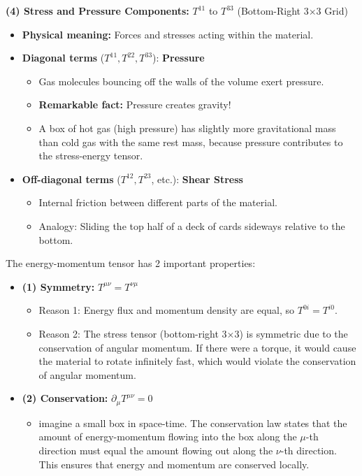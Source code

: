 \begin{foundation}
  \bigskip\noindent
  \textbf{(4) Stress and Pressure Components: } $T^{11}$ to $T^{33}$ (Bottom-Right 3×3 Grid)
  \begin{itemize}
    \item \textbf{Physical meaning:} Forces and stresses acting within the material.
    \medskip
    \item \textbf{Diagonal terms } ($T^{11}, T^{22}, T^{33}$): \textbf{Pressure}
    \begin{itemize}
      \item Gas molecules bouncing off the walls of the volume exert pressure.
      \item \textbf{Remarkable fact:} Pressure creates gravity!
      \item A box of hot gas (high pressure) has slightly more gravitational mass than cold gas with the same rest mass, because pressure contributes to the stress-energy tensor.
    \end{itemize}
    \medskip
    \item \textbf{Off-diagonal terms } ($T^{12}, T^{23}$, etc.): \textbf{Shear Stress}
    \begin{itemize}
      \item Internal friction between different parts of the material.
      \item Analogy: Sliding the top half of a deck of cards sideways relative to the bottom.
    \end{itemize}
  \end{itemize}
\end{foundation}

\newpage
\bigskip\noindent
\begin{foundation}
  The energy-momentum tensor has 2 important properties: \\
  \begin{itemize}
    \item \textbf{(1) Symmetry:} $T^{\mu\nu} = T^{\nu\mu}$
    \begin{itemize}
      \item Reason 1: Energy flux and momentum density are equal, so $T^{0i} = T^{i0}$.
      \item Reason 2: The stress tensor (bottom-right 3×3) is symmetric due to the conservation of angular momentum. If there were a torque, it would cause the material to rotate infinitely fast, which would violate the conservation of angular momentum.
    \end{itemize}
    \item \textbf{(2) Conservation:} $\partial_\mu T^{\mu\nu} = 0$ \\
    \begin{itemize}
      \item imagine a small box in space-time. The conservation law states that the amount of energy-momentum flowing into the box along the $\mu$-th direction must equal the amount flowing out along the $\nu$-th direction. This ensures that energy and momentum are conserved locally.
    \end{itemize}
  \end{itemize}
\end{foundation}

